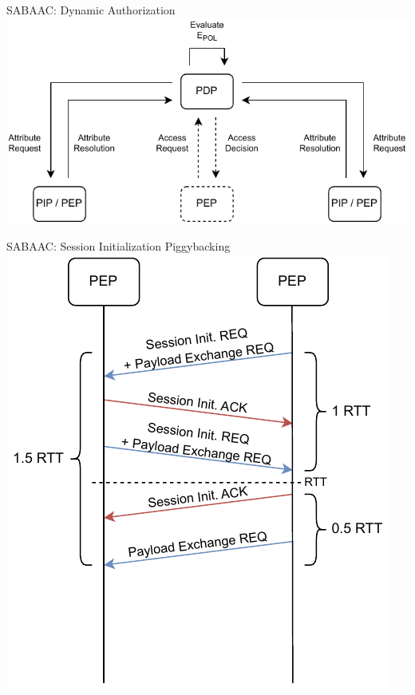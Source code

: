 \documentclass[en]{sdqbeamer}
\begin{document}
\begin{frame}{SABAAC: Dynamic Authorization}
    \centering
    \includegraphics[height=0.75\textheight]{figures/SABAAC_protocols_authorization_dynamic.drawio.pdf}
\end{frame}
\begin{frame}{SABAAC: Session Initialization Piggybacking}
    \centering
    \includegraphics[height=0.75\textheight]{figures/SABAAC_protocols_accesscontrol_initialization_rtt_piggyback.drawio.pdf}
\end{frame}
\end{document}
